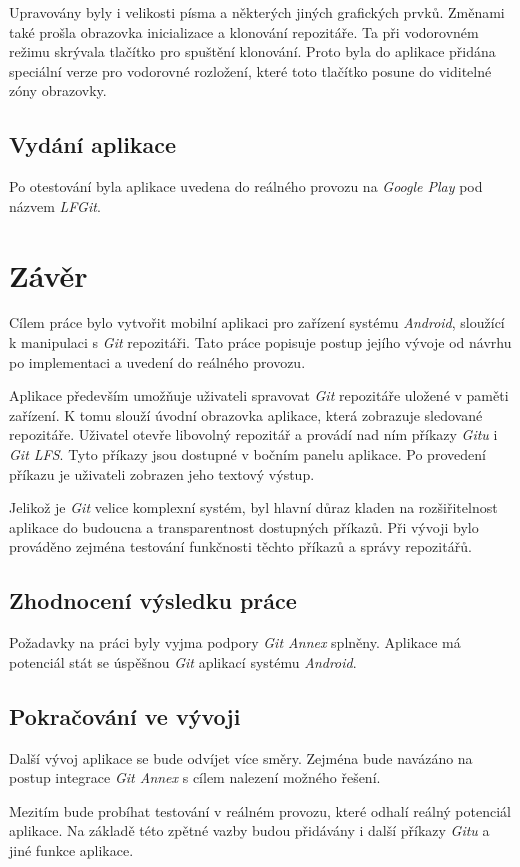 Upravovány byly i velikosti písma a některých jiných grafických prvků. Změnami také prošla obrazovka inicializace a klonování repozitáře. Ta při vodorovném režimu skrývala tlačítko pro spuštění klonování. Proto byla do aplikace přidána speciální verze pro vodorovné rozložení, které toto tlačítko posune do viditelné zóny obrazovky.

\section{Vydání aplikace}
Po otestování byla aplikace uvedena do reálného provozu na \emph{Google Play} pod názvem \emph{LFGit}.

\chapter{Závěr}
Cílem práce bylo vytvořit mobilní aplikaci pro zařízení systému \emph{Android}, sloužící k manipulaci s \emph{Git} repozitáři. Tato práce popisuje postup jejího vývoje od návrhu po implementaci a uvedení do reálného provozu.

Aplikace především umožňuje uživateli spravovat \emph{Git} repozitáře uložené v paměti zařízení. K tomu slouží úvodní obrazovka aplikace, která zobrazuje sledované repozitáře. Uživatel otevře libovolný repozitář a provádí nad ním příkazy \emph{Gitu} i \emph{Git LFS}. Tyto příkazy jsou dostupné v bočním panelu aplikace. Po provedení příkazu je uživateli zobrazen jeho textový výstup.

Jelikož je \emph{Git} velice komplexní systém, byl hlavní důraz kladen na rozšiřitelnost aplikace do budoucna a transparentnost dostupných příkazů. Při vývoji bylo prováděno zejména testování funkčnosti těchto příkazů a správy repozitářů.

\section{Zhodnocení výsledku práce}
Požadavky na práci byly vyjma podpory \emph{Git Annex} splněny. Aplikace má potenciál stát se úspěšnou \emph{Git} aplikací systému \emph{Android}.

\section{Pokračování ve vývoji}
Další vývoj aplikace se bude odvíjet více směry. Zejména bude navázáno na postup integrace \emph{Git Annex} s cílem nalezení možného řešení.

Mezitím bude probíhat testování v reálném provozu, které odhalí reálný potenciál aplikace. Na základě této zpětné vazby budou přidávány i další příkazy \emph{Gitu} a jiné funkce aplikace.
